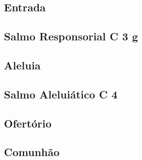 
\subsection{Entrada}\label{subsection:tempus-nativitatis/in-nativitatis-domini/introitus}

\AllowPageFlush

\subsection[Salmo Responsorial]{Salmo Responsorial \textmd{C 3 g}}\label{subsection:tempus-nativitatis/in-nativitatis-domini/psalmus-responsorius}

\AllowPageFlush

\subsection{Aleluia}\label{subsection:tempus-nativitatis/in-nativitatis-domini/alleluia}

\AllowPageFlush

\subsection[Salmo Aleluiático]{Salmo Aleluiático \textmd{C 4}}\label{subsection:tempus-nativitatis/in-nativitatis-domini/psalmus-alleluiaticus}

\AllowPageFlush

\subsection{Ofertório}\label{subsection:tempus-nativitatis/in-nativitatis-domini/offertorium}

\AllowPageFlush

\subsection{Comunhão}\label{subsection:tempus-nativitatis/in-nativitatis-domini/communio}

\AllowPageFlush